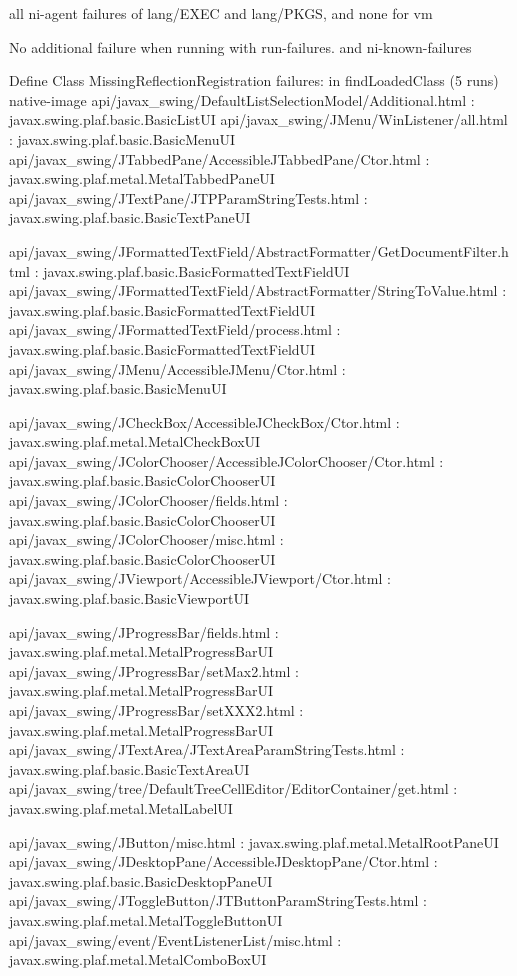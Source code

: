 all ni-agent failures of lang/EXEC and lang/PKGS, and none for vm

No additional failure when running with run-failures. and ni-known-failures

Define Class MissingReflectionRegistration failures: in findLoadedClass (5 runs)
native-image api/javax_swing/DefaultListSelectionModel/Additional.html : javax.swing.plaf.basic.BasicListUI
api/javax_swing/JMenu/WinListener/all.html : javax.swing.plaf.basic.BasicMenuUI
api/javax_swing/JTabbedPane/AccessibleJTabbedPane/Ctor.html : javax.swing.plaf.metal.MetalTabbedPaneUI
api/javax_swing/JTextPane/JTPParamStringTests.html : javax.swing.plaf.basic.BasicTextPaneUI

api/javax_swing/JFormattedTextField/AbstractFormatter/GetDocumentFilter.html : javax.swing.plaf.basic.BasicFormattedTextFieldUI
api/javax_swing/JFormattedTextField/AbstractFormatter/StringToValue.html : javax.swing.plaf.basic.BasicFormattedTextFieldUI
api/javax_swing/JFormattedTextField/process.html : javax.swing.plaf.basic.BasicFormattedTextFieldUI
api/javax_swing/JMenu/AccessibleJMenu/Ctor.html : javax.swing.plaf.basic.BasicMenuUI

api/javax_swing/JCheckBox/AccessibleJCheckBox/Ctor.html : javax.swing.plaf.metal.MetalCheckBoxUI
api/javax_swing/JColorChooser/AccessibleJColorChooser/Ctor.html : javax.swing.plaf.basic.BasicColorChooserUI
api/javax_swing/JColorChooser/fields.html : javax.swing.plaf.basic.BasicColorChooserUI
api/javax_swing/JColorChooser/misc.html : javax.swing.plaf.basic.BasicColorChooserUI
api/javax_swing/JViewport/AccessibleJViewport/Ctor.html : javax.swing.plaf.basic.BasicViewportUI

api/javax_swing/JProgressBar/fields.html : javax.swing.plaf.metal.MetalProgressBarUI
api/javax_swing/JProgressBar/setMax2.html : javax.swing.plaf.metal.MetalProgressBarUI
api/javax_swing/JProgressBar/setXXX2.html : javax.swing.plaf.metal.MetalProgressBarUI
api/javax_swing/JTextArea/JTextAreaParamStringTests.html : javax.swing.plaf.basic.BasicTextAreaUI
api/javax_swing/tree/DefaultTreeCellEditor/EditorContainer/get.html : javax.swing.plaf.metal.MetalLabelUI

api/javax_swing/JButton/misc.html : javax.swing.plaf.metal.MetalRootPaneUI
api/javax_swing/JDesktopPane/AccessibleJDesktopPane/Ctor.html : javax.swing.plaf.basic.BasicDesktopPaneUI
api/javax_swing/JToggleButton/JTButtonParamStringTests.html : javax.swing.plaf.metal.MetalToggleButtonUI
api/javax_swing/event/EventListenerList/misc.html : javax.swing.plaf.metal.MetalComboBoxUI
